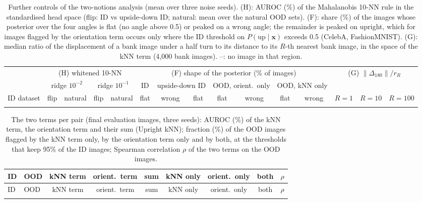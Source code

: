 \documentclass[10pt]{article}
\newcommand{\up}{\mathrm{up}}
\begin{document}
\begin{table}[H]\centering\footnotesize\setlength{\tabcolsep}{2.4pt}
\begin{tabular}{@{}l|cc|cc|c|cc|cc|cc|ccc@{}}\toprule
 & \multicolumn{4}{c|}{(H) whitened 10-NN} & \multicolumn{7}{c|}{(F) shape of the posterior (\% of images)} & \multicolumn{3}{c}{(G) $\|\Delta_{180}\|/r_R$}\\
 & \multicolumn{2}{c|}{ridge $10^{-2}$} & \multicolumn{2}{c|}{ridge $10^{-1}$} & ID & \multicolumn{2}{c|}{upside-down ID} & \multicolumn{2}{c|}{OOD, orient.\ only} & \multicolumn{2}{c|}{OOD, kNN only} & & & \\
ID dataset & flip & natural & flip & natural & flat & wrong & flat & flat & wrong & flat & wrong & $R=1$ & $R=10$ & $R=100$\\\midrule
{}{supp_controls2.tex}
\bottomrule
\end{tabular}
\caption{Further controls of the two-notions analysis (mean over three noise seeds). (H): AUROC (\%) of the Mahalanobis 10-NN rule in the standardised head space (flip: ID vs upside-down ID; natural: mean over the natural OOD sets). (F): share (\%) of the images whose posterior over the four angles is flat (no angle above 0.5) or peaked on a wrong angle; the remainder is peaked on upright, which for images flagged by the orientation term occurs only where the ID threshold on $P(\up\mid\mathbf{x})$ exceeds 0.5 (CelebA, FashionMNIST). (G): median ratio of the displacement of a bank image under a half turn to its distance to its $R$-th nearest bank image, in the space of the kNN term (4{,}000 bank images). --: no image in that region.}
\label{tab:controls2}
\end{table}

{\small\setlength{\tabcolsep}{5pt}
\begin{longtable}{@{}llccccccc@{}}
\caption{The two terms per pair (final evaluation images, three seeds): AUROC (\%) of the kNN term, the orientation term and their sum (Upright kNN); fraction (\%) of the OOD images flagged by the kNN term only, by the orientation term only and by both, at the thresholds that keep 95\% of the ID images; Spearman correlation $\rho$ of the two terms on the OOD images.}\label{tab:twosets}\\\toprule
ID & OOD & kNN term & orient.\ term & sum & kNN only & orient.\ only & both & $\rho$\\\midrule\endfirsthead
\toprule ID & OOD & kNN term & orient.\ term & sum & kNN only & orient.\ only & both & $\rho$\\\midrule\endhead
{}{supp_two_sets.tex}
\bottomrule
\end{longtable}}
\end{document}
